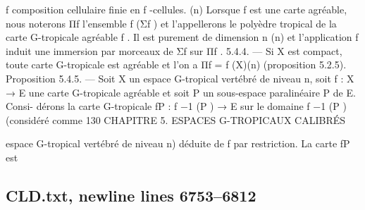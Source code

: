 \documentclass[
  10pt,
]{article}
\newenvironment{Shaded}{}{}
\newcommand{\NormalTok}[1]{#1}
\begin{document}
\begin{Shaded}
\begin{Highlighting}[]
\NormalTok{                                      f}
\NormalTok{composition cellulaire finie en f {-}cellules.}
\NormalTok{                                                                         (n)}
\NormalTok{   Lorsque f est une carte agréable, nous noterons Πf l’ensemble f (Σf ) et l’appellerons}
\NormalTok{le polyèdre tropical de la carte G{-}tropicale agréable f . Il est purement de dimension n}
\NormalTok{                                                               (n)}
\NormalTok{et l’application f induit une immersion par morceaux de Σf sur Πf .}
\NormalTok{5.4.4. — Si X est compact, toute carte G{-}tropicale est agréable et l’on a Πf = f (X)(n)}
\NormalTok{(proposition 5.2.5).}
\NormalTok{Proposition 5.4.5. — Soit X un espace G{-}tropical vertébré de niveau n, soit f : X →}
\NormalTok{E une carte G{-}tropicale agréable et soit P un sous{-}espace paralinéaire P de E. Consi{-}}
\NormalTok{dérons la carte G{-}tropicale fP : f −1 (P ) → E sur le domaine f −1 (P ) (considéré comme}
\NormalTok{130                      CHAPITRE 5. ESPACES G{-}TROPICAUX CALIBRÉS}

\NormalTok{espace G{-}tropical vertébré de niveau n) déduite de f par restriction. La carte fP est}
\end{Highlighting}
\end{Shaded}

\subsection{CLD.txt, newline lines
6753--6812}\label{cld.txt-newline-lines-67536812}
\end{document}
